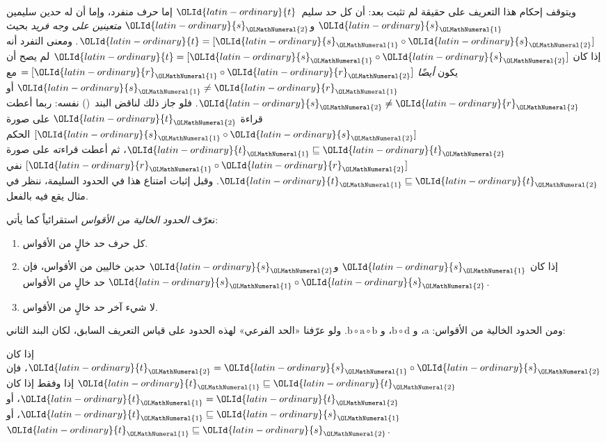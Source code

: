 \documentclass[../../../include/open-logic-section]{subfiles}
\begin{document}
ويتوقف إحكام هذا التعريف على حقيقة لم تثبت بعد: أن كل حد سليم~$\OLId{latin-ordinary}{t}$
إما حرف منفرد، وإما أن له حدين سليمين $\OLId{latin-ordinary}{s}_\OLMathNumeral{1}$ و$\OLId{latin-ordinary}{s}_\OLMathNumeral{2}$
\emph{متعينين على وجه فريد} بحيث $\OLId{latin-ordinary}{t} = [\OLId{latin-ordinary}{s}_\OLMathNumeral{1} \circ \OLId{latin-ordinary}{s}_\OLMathNumeral{2}]$. ومعنى التفرد
أنه إذا كان $\OLId{latin-ordinary}{t} = [\OLId{latin-ordinary}{s}_\OLMathNumeral{1} \circ \OLId{latin-ordinary}{s}_\OLMathNumeral{2}]$ لم يصح أن يكون \emph{أيضًا}
$= [\OLId{latin-ordinary}{r}_\OLMathNumeral{1} \circ \OLId{latin-ordinary}{r}_\OLMathNumeral{2}]$ مع $\OLId{latin-ordinary}{s}_\OLMathNumeral{1} \neq \OLId{latin-ordinary}{r}_\OLMathNumeral{1}$ أو $\OLId{latin-ordinary}{s}_\OLMathNumeral{2} \neq \OLId{latin-ordinary}{r}_\OLMathNumeral{2}$.
فلو جاز ذلك لناقض البند~() نفسه: ربما أعطت قراءة $\OLId{latin-ordinary}{t}_\OLMathNumeral{2}$ على صورة
$[\OLId{latin-ordinary}{s}_\OLMathNumeral{1} \circ \OLId{latin-ordinary}{s}_\OLMathNumeral{2}]$ الحكم $\OLId{latin-ordinary}{t}_\OLMathNumeral{1} \sqsubseteq \OLId{latin-ordinary}{t}_\OLMathNumeral{2}$، ثم أعطت قراءته على
صورة $[\OLId{latin-ordinary}{r}_\OLMathNumeral{1} \circ \OLId{latin-ordinary}{r}_\OLMathNumeral{2}]$ نفي $\OLId{latin-ordinary}{t}_\OLMathNumeral{1} \sqsubseteq \OLId{latin-ordinary}{t}_\OLMathNumeral{2}$. وقبل إثبات امتناع
هذا في الحدود السليمة، ننظر في مثال يقع فيه بالفعل.

\begin{defn}
  نعرّف \emph{الحدود الخالية من الأقواس} استقرائياً كما يأتي:
  \begin{enumerate}
  \item كل حرف حد خالٍ من الأقواس.
  \item إذا كان $\OLId{latin-ordinary}{s}_\OLMathNumeral{1}$ و$\OLId{latin-ordinary}{s}_\OLMathNumeral{2}$ حدين خاليين من الأقواس، فإن
    $\OLId{latin-ordinary}{s}_\OLMathNumeral{1} \circ \OLId{latin-ordinary}{s}_\OLMathNumeral{2}$ حد خالٍ من الأقواس.
  \item لا شيء آخر حد خالٍ من الأقواس.
  \end{enumerate}
\end{defn}

ومن الحدود الخالية من الأقواس: $\mathrm{a}$، و
$\mathrm{b} \circ \mathrm{d}$، و
$\mathrm{b} \circ \mathrm{a} \circ \mathrm{b}$. ولو عرّفنا «الحد
الفرعي» لهذه الحدود على قياس التعريف السابق، لكان البند الثاني:
\begin{center}
  إذا كان $\OLId{latin-ordinary}{t}_\OLMathNumeral{2} = \OLId{latin-ordinary}{s}_\OLMathNumeral{1} \circ \OLId{latin-ordinary}{s}_\OLMathNumeral{2}$، فإن $\OLId{latin-ordinary}{t}_\OLMathNumeral{1} \sqsubseteq \OLId{latin-ordinary}{t}_\OLMathNumeral{2}$ إذا وفقط إذا
  كان $\OLId{latin-ordinary}{t}_\OLMathNumeral{1} = \OLId{latin-ordinary}{t}_\OLMathNumeral{2}$، أو $\OLId{latin-ordinary}{t}_\OLMathNumeral{1} \sqsubseteq \OLId{latin-ordinary}{s}_\OLMathNumeral{1}$، أو
  $\OLId{latin-ordinary}{t}_\OLMathNumeral{1} \sqsubseteq \OLId{latin-ordinary}{s}_\OLMathNumeral{2}$.
\end{center}
\end{document}
